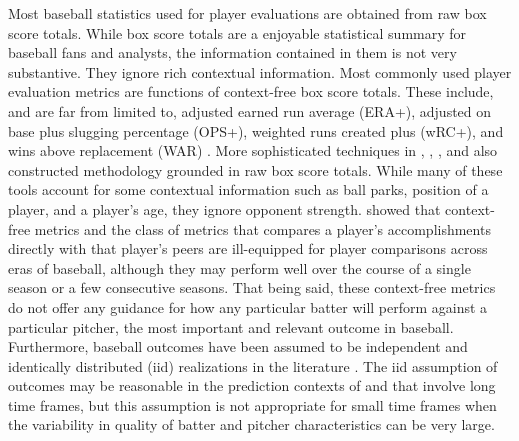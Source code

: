 \documentclass[11pt]{article}
\begin{document}
Most baseball statistics used for player evaluations are obtained from raw box score totals. While box score totals are a enjoyable statistical summary for baseball fans and analysts, the information contained in them is not very substantive. They ignore rich contextual information. Most commonly used player evaluation metrics are functions of context-free box score totals. These include, and are far from limited to, adjusted earned run average (ERA+), adjusted on base plus slugging percentage (OPS+), weighted runs created plus (wRC+), and wins above replacement (WAR) \citep{bref, fangraphs}. More sophisticated techniques in \citet{berry1999bridging}, \citet{brown2008season}, \cite{jensen2009hierarchical}, and \cite{baumer2015openwar} also constructed methodology grounded in raw box score totals. While many of these tools account for some contextual information such as ball parks, position of a player, and a player's age, they ignore opponent strength. %
\cite{eck2020challenging} showed that context-free metrics and the class of metrics that compares a player's accomplishments directly with that player's peers are ill-equipped for player comparisons across eras of baseball, although they may perform well over the course of a single season or a few consecutive seasons. That being said, these context-free metrics do not offer any guidance for how any particular batter will perform against a particular pitcher, the most important and relevant outcome in baseball. Furthermore, baseball outcomes have been assumed to be independent and identically distributed (iid) realizations in the literature \citep{brown2008season, jensen2009hierarchical}. The iid assumption of outcomes may be reasonable in the prediction contexts of \cite{brown2008season} and \cite{jensen2009hierarchical} that involve long time frames, but this assumption is not appropriate for small time frames when the variability in quality of batter and pitcher characteristics can be very large.




%
\end{document}
